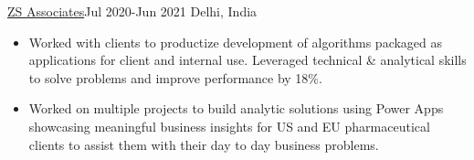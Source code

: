 \documentclass[10pt,a4paper,ragged2e]{altacv}
\begin{document}
 {\color{mecol}\href{https://www.zs.com/}{ZS Associates}}{Jul 2020-Jun 2021 }{Delhi, India}
\begin{itemize}

\item { Worked with clients to productize development of algorithms packaged as applications for client and internal use. Leveraged technical \& analytical skills to solve problems and improve performance by 18\%.}
\item {Worked on multiple projects to build analytic solutions using Power Apps showcasing meaningful business insights for US and EU pharmaceutical clients to assist them with their day to day business problems. }




\end{itemize}
\divider
\end{document}
